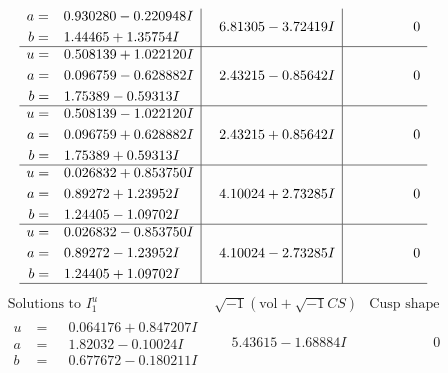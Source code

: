 \documentclass[1p]{elsarticle_modified}
\theoremstyle{definition}
\newcommand{\I}{\sqrt{-1}}
\begin{document}
$$\begin{array}{c|c|c}
\begin{aligned}
a &= \phantom{-}0.930280 - 0.220948 I \\
b &= \phantom{-}1.44465 + 1.35754 I\end{aligned}
 & \phantom{-}6.81305 - 3.72419 I & \phantom{-0.000000 } 0 \\ \hline\begin{aligned}
u &= \phantom{-}0.508139 + 1.022120 I \\
a &= \phantom{-}0.096759 - 0.628882 I \\
b &= \phantom{-}1.75389 - 0.59313 I\end{aligned}
 & \phantom{-}2.43215 - 0.85642 I & \phantom{-0.000000 } 0 \\ \hline\begin{aligned}
u &= \phantom{-}0.508139 - 1.022120 I \\
a &= \phantom{-}0.096759 + 0.628882 I \\
b &= \phantom{-}1.75389 + 0.59313 I\end{aligned}
 & \phantom{-}2.43215 + 0.85642 I & \phantom{-0.000000 } 0 \\ \hline\begin{aligned}
u &= \phantom{-}0.026832 + 0.853750 I \\
a &= \phantom{-}0.89272 + 1.23952 I \\
b &= \phantom{-}1.24405 - 1.09702 I\end{aligned}
 & \phantom{-}4.10024 + 2.73285 I & \phantom{-0.000000 } 0 \\ \hline\begin{aligned}
u &= \phantom{-}0.026832 - 0.853750 I \\
a &= \phantom{-}0.89272 - 1.23952 I \\
b &= \phantom{-}1.24405 + 1.09702 I\end{aligned}
 & \phantom{-}4.10024 - 2.73285 I & \phantom{-0.000000 } 0\\
 \hline 
 \end{array}$$\newpage$$\begin{array}{c|c|c}  
\text{Solutions to }I^u_{1}& \I (\text{vol} + \sqrt{-1}CS) & \text{Cusp shape}\\
 \hline 
\begin{aligned}
u &= \phantom{-}0.064176 + 0.847207 I \\
a &= \phantom{-}1.82032 - 0.10024 I \\
b &= \phantom{-}0.677672 - 0.180211 I\end{aligned}
 & \phantom{-}5.43615 - 1.68884 I & \phantom{-0.000000 } 0 \\ \hline\begin{aligned}

\end{aligned}
\end{array}$$
\end{document}
